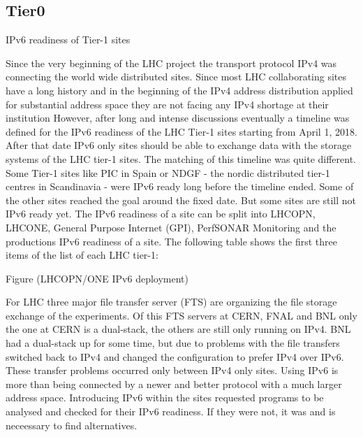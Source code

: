 \subsection{Tier0}

IPv6 readiness of Tier-1 sites
 
Since the very beginning of the LHC project the transport protocol IPv4 was connecting the world wide distributed sites. Since most LHC collaborating sites have a long history and in the beginning of the IPv4 address distribution applied for substantial address space they are not facing any IPv4 shortage at their institution However, after long and intense discussions eventually a timeline was defined for the IPv6 readiness of the LHC Tier-1 sites starting from April 1, 2018. After that date IPv6 only sites should be able to exchange data with the storage systems of the LHC tier-1 sites.  
The matching of this timeline was quite different. Some Tier-1 sites like PIC in Spain or NDGF - the nordic distributed tier-1 centres in Scandinavia - were IPv6 ready long before the timeline ended. Some of the other sites reached the goal around the fixed date. But some sites are still not IPv6 ready yet. The IPv6 readiness of a site can be split into LHCOPN, LHCONE, General Purpose Internet (GPI), PerfSONAR Monitoring and the productions IPv6 readiness of a site. The following table shows the first three items of the list of each LHC tier-1:

Figure (LHCOPN/ONE IPv6 deployment)

 
For LHC three major file transfer server (FTS) are organizing the file storage exchange of the experiments. Of this FTS servers at CERN, FNAL and BNL only the one at CERN is a dual-stack, the others are still only running on IPv4. BNL had a dual-stack up for some time, but due to problems with the file transfers switched back to IPv4 and changed the configuration to prefer IPv4 over IPv6. These transfer problems occurred only between IPv4 only sites.
Using IPv6 is more than being connected by a newer and better protocol with a much larger address space. Introducing IPv6 within the sites requested programs to be analysed and checked for their IPv6 readiness. If they were not, it was and is neceessary to find alternatives. 

